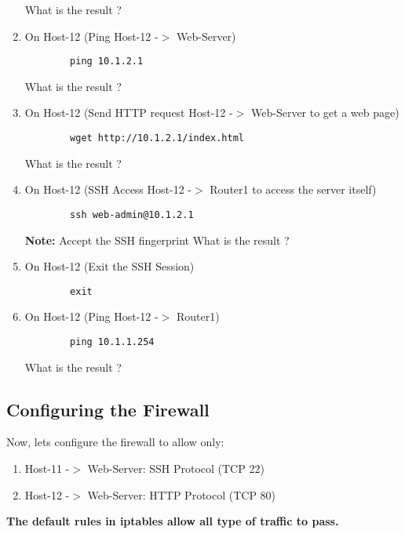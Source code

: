 \begin{enumerate}
	What is the result ?

	\item On Host-12 (Ping Host-12 -$>$ Web-Server)
	\begin{verbatim}
	    ping 10.1.2.1
	\end{verbatim}

	What is the result ?
	\item On Host-12 (Send HTTP request Host-12 -$>$ Web-Server to get a web page)
	\begin{verbatim}
	    wget http://10.1.2.1/index.html
	\end{verbatim}

	What is the result ?
	\item On Host-12 (SSH Access Host-12 -$>$ Router1 to access the server itself)
	\begin{verbatim}
	    ssh web-admin@10.1.2.1
	\end{verbatim}

	\textbf{Note:} Accept the SSH fingerprint
	\newline
	\newline
	What is the result ?

  \item On Host-12 (Exit the SSH Session)
	\begin{verbatim}
	    exit
	\end{verbatim}

  \item On Host-12 (Ping Host-12 -$>$ Router1)
	\begin{verbatim}
	    ping 10.1.1.254
	\end{verbatim}

	What is the result ?
\end{enumerate}

\subsection{Configuring the Firewall}

Now, lets configure the firewall to allow only:
\begin{enumerate}
	\item Host-11 -$>$ Web-Server: SSH Protocol (TCP 22)
	\item Host-12 -$>$ Web-Server: HTTP Protocol (TCP 80)
\end{enumerate}

\textbf{The default rules in iptables allow all type of traffic to pass.}

